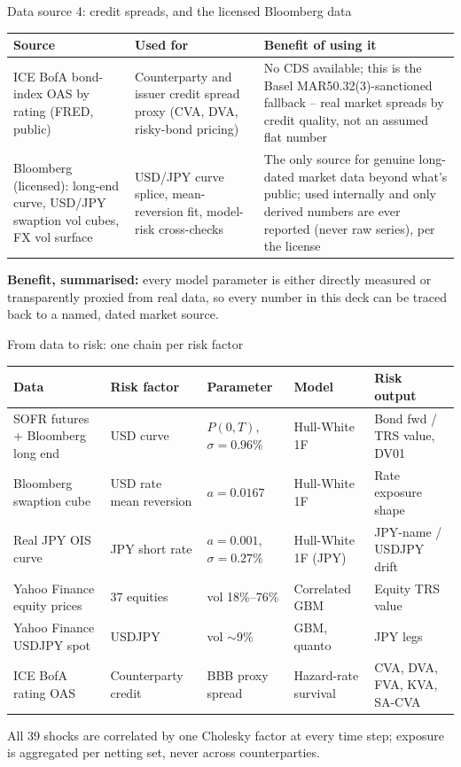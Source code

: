 \documentclass[8pt,aspectratio=169]{beamer}
\begin{document}
\begin{frame}{Data source 4: credit spreads, and the licensed Bloomberg data}
  \small
  \begin{tabular}{p{}p{}p{}}
    \toprule
    \textbf{Source} & \textbf{Used for} & \textbf{Benefit of using it} \\
    \midrule
    ICE BofA bond-index OAS by rating (FRED, public) & Counterparty and issuer credit spread proxy (CVA, DVA, risky-bond pricing) & No CDS available; this is the Basel MAR50.32(3)-sanctioned fallback -- real market spreads by credit quality, not an assumed flat number \\
    Bloomberg (licensed): long-end curve, USD/JPY swaption vol cubes, FX vol surface & USD/JPY curve splice, mean-reversion fit, model-risk cross-checks & The only source for genuine long-dated market data beyond what's public; used internally and only derived numbers are ever reported (never raw series), per the license \\
    \bottomrule
  \end{tabular}
  \vspace{6pt}

  \textbf{Benefit, summarised:} every model parameter is either directly measured or transparently proxied from real data, so every number in this deck can be traced back to a named, dated market source.
\end{frame}

\begin{frame}{From data to risk: one chain per risk factor}
  \scriptsize
  \begin{tabular}{p{}p{}p{}p{}p{}}
    \toprule
    \textbf{Data} & \textbf{Risk factor} & \textbf{Parameter} & \textbf{Model} & \textbf{Risk output} \\
    \midrule
    SOFR futures + Bloomberg long end & USD curve & $P(0,T)$, $\sigma{=}0.96\%$ & Hull-White 1F & Bond fwd / TRS value, DV01 \\
    Bloomberg swaption cube & USD rate mean reversion & $a{=}0.0167$ & Hull-White 1F & Rate exposure shape \\
    Real JPY OIS curve & JPY short rate & $a{=}0.001$, $\sigma{=}0.27\%$ & Hull-White 1F (JPY) & JPY-name / USDJPY drift \\
    Yahoo Finance equity prices & 37 equities & vol 18\%--76\% & Correlated GBM & Equity TRS value \\
    Yahoo Finance USDJPY spot & USDJPY & vol $\sim$9\% & GBM, quanto & JPY legs \\
    ICE BofA rating OAS & Counterparty credit & BBB proxy spread & Hazard-rate survival & CVA, DVA, FVA, KVA, SA-CVA \\
    \bottomrule
  \end{tabular}
  \vspace{10pt}

  All 39 shocks are correlated by one Cholesky factor at every time step; exposure is aggregated per netting set, never across counterparties.
\end{frame}
\end{document}
